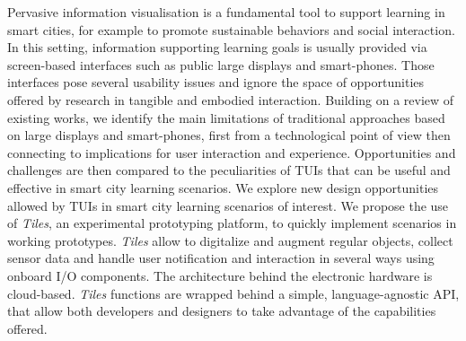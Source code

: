 Pervasive information visualisation is a fundamental tool to support learning in smart cities, for example to promote sustainable behaviors and social interaction. In this setting, information supporting learning goals is usually provided via screen-based interfaces such as public large displays and smart-phones. Those interfaces pose several usability issues and ignore the space of opportunities offered by research in tangible and embodied interaction.
Building on a review of existing works, we identify the main limitations of traditional approaches based on large displays and smart-phones, first from a technological point of view then connecting to implications for user interaction and experience.
Opportunities and challenges are then compared to the peculiarities of TUIs that can be useful and effective in smart city learning scenarios.
We explore new design opportunities allowed by TUIs in smart city learning scenarios of interest. We propose the use of \emph{Tiles}, an experimental prototyping platform, to quickly implement scenarios in working prototypes.
\emph{Tiles} allow to digitalize and augment regular objects, collect sensor data and handle user notification and interaction in several ways using onboard I/O components.
The architecture behind the electronic hardware is cloud-based. \emph{Tiles} functions are wrapped behind a simple, language-agnostic API, that allow both developers and designers to take advantage of the capabilities offered.
